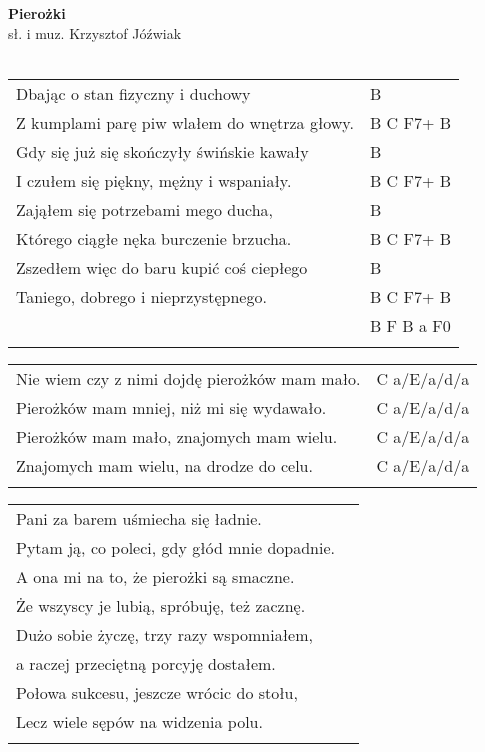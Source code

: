 \documentclass[a5paper]{article}
\begin{document}


\noindent
\fontsize{12pt}{15pt}\selectfont
\textbf{Pierożki} \\
\fontsize{8pt}{10pt}\selectfont
sł. i muz. Krzysztof Jóźwiak \\ \\
\fontsize{10pt}{12pt}\selectfont
{}
\begin{tabular}{@{}p{8.50cm}p{3cm}@{}}
\noindent
Dbając o stan fizyczny i duchowy & B \\
Z kumplami parę piw wlałem do wnętrza głowy. & B C F7+ B \\
Gdy się już się skończyły świńskie kawały & B \\
I czułem się piękny, mężny i wspaniały. & B C F7+ B \\
Zająłem się potrzebami mego ducha, & B \\
Którego ciągłe nęka burczenie brzucha. & B C F7+ B \\
Zszedłem więc do baru kupić coś ciepłego & B \\
Taniego, dobrego i nieprzystępnego. & B C F7+ B \\
& B F B a F0 \\ \\
\end{tabular}

\noindent
\begin{tabular}{@{}p{7.50cm}p{3cm}@{}}
Nie wiem czy z nimi dojdę pierożków mam mało. & C a/E/a/d/a \\
Pierożków mam mniej, niż mi się wydawało.& C a/E/a/d/a \\
Pierożków mam mało, znajomych mam wielu. & C a/E/a/d/a \\
Znajomych mam wielu, na drodze do celu. & C a/E/a/d/a \\ \\
\end{tabular}

\noindent
\begin{tabular}{@{}p{9.50cm}p{3cm}@{}}
Pani za barem uśmiecha się ładnie.\\
Pytam ją, co poleci, gdy głód mnie dopadnie.\\
A ona mi na to, że pierożki są smaczne.\\
Że wszyscy je lubią, spróbuję, też zacznę.\\
Dużo sobie życzę, trzy razy wspomniałem,\\
a raczej przeciętną porcyję dostałem.\\
Połowa sukcesu, jeszcze wrócic do stołu,\\
Lecz wiele sępów na widzenia polu.\\ \\
\end{tabular}
\end{document}
